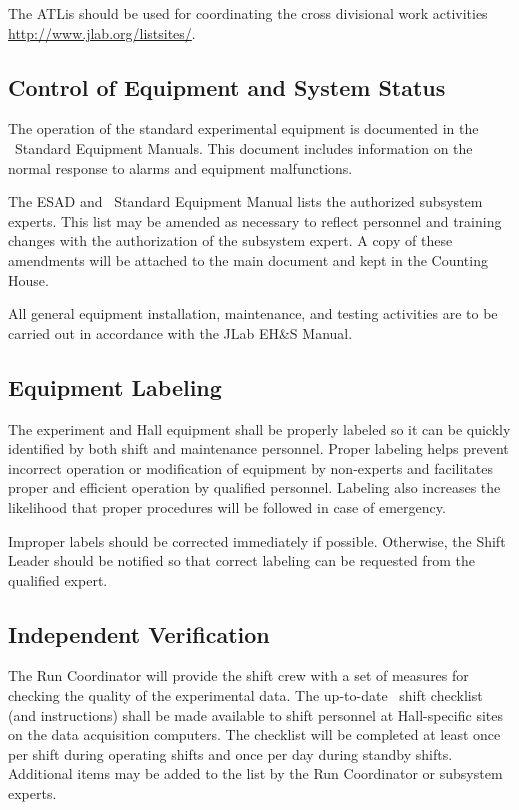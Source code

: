 \documentclass[11pt]{article}
\begin{document}
The ATLis should be used for coordinating the cross divisional work activities
\url{http://www.jlab.org/listsites/}. 

\subsection{Control of Equipment and System Status}
\indent

The operation of the standard experimental equipment is documented in the 
\HALL\ Standard Equipment Manuals.
This document includes information on the
normal response to alarms and equipment malfunctions.
 
The ESAD and \HALL\ Standard Equipment Manual lists 
the authorized subsystem experts. This list may be amended as necessary to 
reflect personnel and training changes with the 
authorization of the subsystem expert. A copy of these 
amendments will be attached to the main document and kept in the
Counting House.

All general equipment installation, maintenance, and testing activities 
are to be carried out in accordance with the JLab EH\&S Manual.

\subsection{Equipment Labeling}
\indent

The experiment and Hall equipment shall be properly labeled so 
it can be quickly identified by both shift and maintenance personnel.
Proper labeling helps prevent incorrect operation or modification of
equipment by non-experts and facilitates proper and efficient operation by
qualified personnel. Labeling also increases the likelihood that 
proper procedures will be followed in case of emergency.

Improper labels should be corrected immediately if possible.
Otherwise, the Shift Leader should be notified so that correct 
labeling can be requested from the qualified expert.


\subsection{Independent Verification}
\indent
	
The Run Coordinator will provide the shift crew with a set of 
measures for checking the quality of the experimental data.  
The up-to-date \HALL\ shift 
checklist (and instructions) shall be made available to shift personnel
at Hall-specific sites on the data acquisition  computers.
The checklist will be completed at least once per shift during operating 
shifts and once per day during standby shifts. Additional items may be 
added to the list by the Run Coordinator or subsystem experts.
\end{document}
